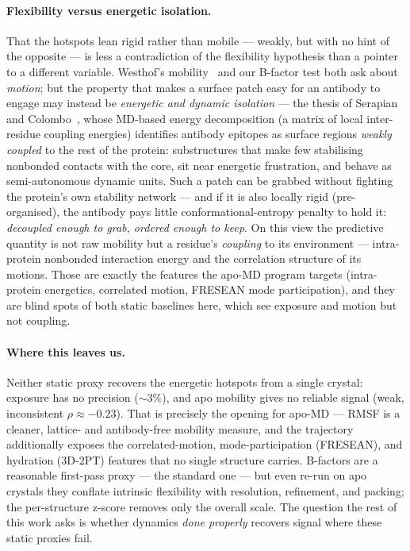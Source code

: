 \paragraph{Flexibility versus energetic isolation.} That the hotspots lean rigid rather than mobile
--- weakly, but with no hint of the opposite --- is less a contradiction of the flexibility hypothesis
than a pointer to a different variable. Westhof's
mobility~\cite{westhof1984} and our B-factor test both ask about \emph{motion}; but the property that
makes a surface patch easy for an antibody to engage may instead be \emph{energetic and dynamic
isolation} --- the thesis of Serapian and Colombo~\cite{serapian2020}, whose MD-based energy
decomposition (a matrix of local inter-residue coupling energies) identifies antibody epitopes as
surface regions \emph{weakly coupled} to the rest of the protein: substructures that make few
stabilising nonbonded contacts with the core, sit near energetic frustration, and behave as
semi-autonomous dynamic units. Such a patch can be grabbed without fighting the protein's own
stability network --- and if it is also locally rigid (pre-organised), the antibody pays little
conformational-entropy penalty to hold it: \emph{decoupled enough to grab, ordered enough to keep}.
On this view the predictive quantity is not raw mobility but a residue's \emph{coupling} to its
environment --- intra-protein nonbonded interaction energy and the correlation structure of its
motions. Those are exactly the features the apo-MD program targets (intra-protein energetics,
correlated motion, FRESEAN mode participation), and they are blind spots of both static baselines
here, which see exposure and motion but not coupling.

\paragraph{Where this leaves us.} Neither static proxy recovers the energetic hotspots from a single
crystal: exposure has no precision ($\sim 3\%$), and apo mobility gives no reliable signal (weak,
inconsistent $\rho \approx -0.23$). That is precisely the opening for apo-MD --- RMSF is a cleaner,
lattice- and antibody-free mobility measure, and the trajectory additionally exposes the
correlated-motion, mode-participation (FRESEAN), and hydration (3D-2PT) features that no single
structure carries. B-factors are a reasonable first-pass proxy --- the standard one --- but even
re-run on apo crystals they conflate intrinsic flexibility with resolution, refinement, and packing;
the per-structure z-score removes only the overall scale. The question the rest of this work asks is
whether dynamics \emph{done properly} recovers signal where these static proxies fail.
